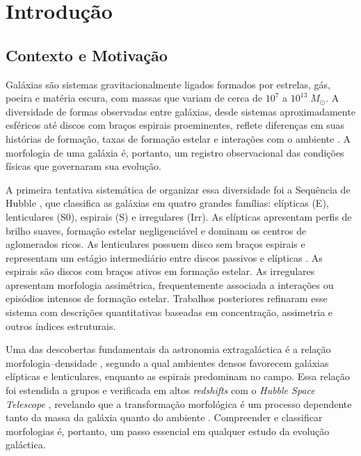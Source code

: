 \documentclass[12pt, a4paper]{article}
\begin{document}
\newpage

\section{Introdução}

\subsection{Contexto e Motivação}

Galáxias são sistemas gravitacionalmente ligados formados por estrelas, gás,
poeira e matéria escura, com massas que variam de cerca de $10^{7}$ a
$10^{13}\;M_\odot$. A diversidade de formas observadas entre galáxias, desde
sistemas aproximadamente esféricos até discos com braços espirais
proeminentes, reflete diferenças em suas histórias de formação, taxas de
formação estelar e interações com o ambiente \cite{conselice2014}. A
morfologia de uma galáxia é, portanto, um registro observacional das
condições físicas que governaram sua evolução.

A primeira tentativa sistemática de organizar essa diversidade foi a
Sequência de Hubble \cite{hubble1926}, que classifica as galáxias em quatro
grandes famílias: elípticas (E), lenticulares (S0), espirais (S) e
irregulares (Irr). As elípticas apresentam perfis de brilho suaves, formação
estelar negligenciável e dominam os centros de aglomerados ricos. As
lenticulares possuem disco sem braços espirais e representam um estágio
intermediário entre discos passivos e elípticas \cite{dressler1997}. As
espirais são discos com braços ativos em formação estelar. As irregulares
apresentam morfologia assimétrica, frequentemente associada a interações ou
episódios intensos de formação estelar. Trabalhos posteriores
\cite{devaucouleurs1959,conselice2014} refinaram esse sistema com descrições
quantitativas baseadas em concentração, assimetria e outros índices
estruturais.

Uma das descobertas fundamentais da astronomia extragaláctica é a relação
morfologia--densidade \cite{dressler1980}, segundo a qual ambientes densos
favorecem galáxias elípticas e lenticulares, enquanto as espirais predominam
no campo. Essa relação foi estendida a grupos \cite{postman1984} e verificada
em altos \textit{redshifts} com o \textit{Hubble Space Telescope}
\cite{dressler1997}, revelando que a transformação morfológica é um processo
dependente tanto da massa da galáxia quanto do ambiente
\cite{peng2010,boselli2022,kravtsov2012,allen2011}. Compreender e classificar
morfologias é, portanto, um passo essencial em qualquer estudo da evolução
galáctica.
\end{document}
